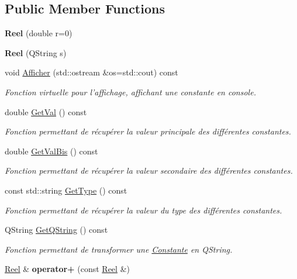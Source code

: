\subsection*{Public Member Functions}
\begin{DoxyCompactItemize}
\item 
\hypertarget{class_reel_ad69ee401f9a73f16abacf65c849fbb7e}{{\bfseries Reel} (double r=0)}\label{class_reel_ad69ee401f9a73f16abacf65c849fbb7e}

\item 
\hypertarget{class_reel_ae3f4716794dd7c64e94ec56accc75dd9}{{\bfseries Reel} (Q\-String s)}\label{class_reel_ae3f4716794dd7c64e94ec56accc75dd9}

\item 
void \hyperlink{class_reel_a52eb23de069729bc2f8b8b2c18e1be7d}{Afficher} (std\-::ostream \&os=std\-::cout) const 
\begin{DoxyCompactList}\small\item\em Fonction virtuelle pour l'affichage, affichant une constante en console. \end{DoxyCompactList}\item 
double \hyperlink{class_reel_a5755a5ed2d9042ad59984967dbddc7f5}{Get\-Val} () const 
\begin{DoxyCompactList}\small\item\em Fonction permettant de récupérer la valeur principale des différentes constantes. \end{DoxyCompactList}\item 
double \hyperlink{class_reel_ab66ca2cb446b1cbc0c3565ff054acc1b}{Get\-Val\-Bis} () const 
\begin{DoxyCompactList}\small\item\em Fonction permettant de récupérer la valeur secondaire des différentes constantes. \end{DoxyCompactList}\item 
const std\-::string \hyperlink{class_reel_ae36b25f3a050292cd6324c0f15dbfb2d}{Get\-Type} () const 
\begin{DoxyCompactList}\small\item\em Fonction permettant de récupérer la valeur du type des différentes constantes. \end{DoxyCompactList}\item 
Q\-String \hyperlink{class_reel_a594333e01d25ecce1335cd25d7cd872e}{Get\-Q\-String} () const 
\begin{DoxyCompactList}\small\item\em Fonction permettant de transformer une \hyperlink{class_constante}{Constante} en Q\-String. \end{DoxyCompactList}\item 
\hypertarget{class_reel_a6a81e5a8d9d1d00e8ec75f4c1e6ca08b}{\hyperlink{class_reel}{Reel} \& {\bfseries operator+} (const \hyperlink{class_reel}{Reel} \&)}\label{class_reel_a6a81e5a8d9d1d00e8ec75f4c1e6ca08b}


\end{DoxyCompactItemize}
